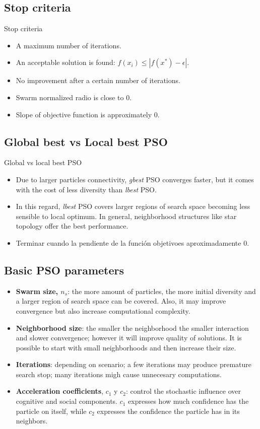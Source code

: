 \documentclass[aspectratio=169,compress,10pt]{beamer}
\begin{document}
\subsection{Stop criteria}
\begin{frame}{Stop criteria}
\begin{itemize}
	\item A maximum number of iterations.
	\item An acceptable solution is found: $f(x_i) \leq |f(x^*) - \epsilon |$.
	\item No improvement after a certain number of iterations.
	\item Swarm normalized radio is close to 0.
	\item Slope of objective function is approximately 0.
\end{itemize}
\end{frame}

\subsection{Global best vs Local best PSO}
\begin{frame}{Global vs local best PSO}
\begin{itemize}
	\item Due to larger particles connectivity, \emph{gbest} PSO converges faster, but it comes with the cost of less diversity than \emph{lbest} PSO.
	\item In this regard, \emph{lbest} PSO covers larger regions of search space becoming less sensible to local optimum.
	In general, neighborhood structures like star topology offer the best performance.
	\item Terminar cuando la pendiente de la función objetivoes aproximadamente 0.
\end{itemize}
\end{frame}


\subsection{Basic PSO parameters}
\begin{itemize}
	\item \textbf{Swarm size, $n_s$}: the more amount of particles, the more initial diversity and a larger region of search space can be covered.
	Also, it may improve convergence but also increase computational complexity.
	\item \textbf{Neighborhood size}: the smaller the neighborhood the smaller interaction and slower convergence; however it will improve quality of solutions.
	It is possible to start with small neighborhoods and then increase their size.
	\item \textbf{Iterations}: depending on scenario; a few iterations may produce premature search stop; many iterations migh cause unnecesary computations.
	\item \textbf{Acceleration coefficients}, $c_1$ y $c_2$: control the stochastic influence over cognitive and social components. 
	$c_1$ expresses how much confidence has the particle on itself, while  $c_2$ expresses the confidence the particle has in its neighbors.
\end{itemize}
\end{document}
